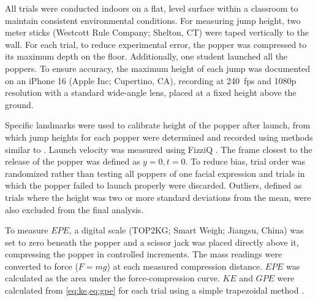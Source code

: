 \documentclass[reprint,amsmath,amssymb,aps,twoside]{revtex4-2} %
\begin{document}
All trials were conducted indoors on a flat, level surface within a classroom to maintain consistent environmental conditions. For measuring jump height, two meter sticks (Westcott Rule Company; Shelton, CT) were taped vertically to the wall. For each trial, to reduce experimental error, the popper was compressed to its maximum depth on the floor. Additionally, one student launched all the poppers. To ensure accuracy, the maximum height of each jump was documented on an iPhone 16 (Apple Inc; Cupertino, CA), recording at \qty{240}{fps} and 1080p resolution with a standard wide-angle lens, placed at a fixed height above the ground. 

Specific landmarks were used to calibrate height of the popper after launch, from which jump heights for each popper were determined and recorded using methods similar to \cite{badmin:2026:investigation}. Launch velocity was measured using FizziQ \cite{chazot:2025:using,badmin:2026:investigation}. The frame closest to the release of the popper was defined as $y = 0, t = 0$. To reduce bias, trial order was randomized rather than testing all poppers of one facial expression and trials in which the popper failed to launch properly were discarded. Outliers, defined as trials where the height was two or more standard deviations from the mean, were also excluded from the final analysis. 

To measure $EPE$, a digital scale (TOP2KG; Smart Weigh; Jiangsu, China) was set to zero beneath the popper and a scissor jack was placed directly above it, compressing the popper in controlled increments. The mass readings were converted to force ($F = mg$) at each measured compression distance. $EPE$ was calculated as the area under the force-compression curve. $KE$ and $GPE$ were calculated from \cref{eq:ke,eq:gpe} for each trial using a simple trapezoidal method \cite{calculus,R}. 
\end{document}
